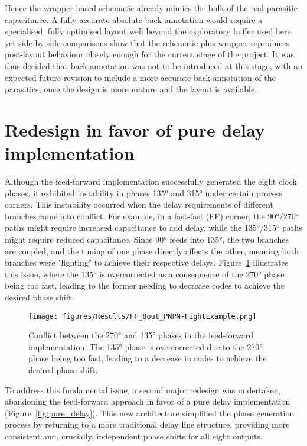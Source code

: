 Hence the wrapper-based schematic already mimics the bulk of the real parasitic capacitance.  
A fully accurate absolute back-annotation would require a specialised, fully optimised layout well beyond the exploratory buffer used here yet side-by-side comparisons show that the schematic plus wrapper reproduces post-layout behaviour closely enough for the current stage of the project.
It was thus decided that back annotation was not to be introduced at this stage, with an expected future revision to include a more accurate back-annotation of the parasitics, once the design is more mature and the layout is available.

\section{Redesign in favor of pure delay implementation}\label{sec:second_redesign}

Although the feed-forward implementation successfully generated the eight clock phases, it exhibited instability in phases \ang{135} and \ang{315} under certain process corners. This instability occurred when the delay requirements of different branches came into conflict. For example, in a fast-fast (FF) corner, the \ang{90}/\ang{270} paths might require increased capacitance to add delay, while the \ang{135}/\ang{315} paths might require reduced capacitance. Since \ang{90} feeds into \ang{135}, the two branches are coupled, and the tuning of one phase directly affects the other, meaning both branches were "fighting" to achieve their respective delays. Figure~\ref{fig:FF_8out_225vs135} illustrates this issue, where the \ang{135} is overcorrected as a consequence of the \ang{270} phase being too fast, leading to the former needing to decrease codes to achieve the desired phase shift.

\begin{figure}[H]
  \centering
  \texttt{[image: figures/Results/FF\_8out\_PNPN-FightExample.png]}
  \caption{Conflict between the \ang{270} and \ang{135} phases in the feed-forward implementation. The \ang{135} phase is overcorrected due to the \ang{270} phase being too fast, leading to a decrease in codes to achieve the desired phase shift.}
  \label{fig:FF_8out_225vs135}
\end{figure}

To address this fundamental issue, a second major redesign was undertaken, abandoning the feed-forward approach in favor of a pure delay implementation (Figure~\ref{fig:pure_delay}). This new architecture simplified the phase generation process by returning to a more traditional delay line structure, providing more consistent and, crucially, independent phase shifts for all eight outputs.

